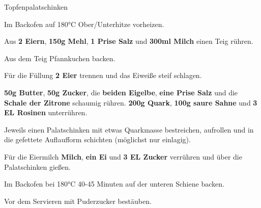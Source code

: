 \begin{recipe}[]{Topfenpalatschinken} %

\step
Im Backofen auf 180°C Ober/Unterhitze vorheizen.

\step
Aus \textbf{2 Eiern}, \textbf{150g Mehl}, \textbf{1 Prise Salz} und \textbf{300ml Milch} einen Teig rühren.

\step
Aus dem Teig Pfannkuchen backen.

\step
Für die Füllung \textbf{2 Eier} trennen und das Eiweiße steif schlagen.

\step
\textbf{50g Butter}, \textbf{50g Zucker}, die \textbf{beiden Eigelbe}, \textbf{eine Prise Salz} und die \textbf{Schale der Zitrone} schaumig rühren. \textbf{200g Quark}, \textbf{100g saure Sahne} und \textbf{3 EL Rosinen} unterrühren.

\step
Jeweils einen Palatschinken mit etwas Quarkmasse bestreichen, aufrollen und in die gefettete Auflaufform schichten (möglichst nur einlagig).

\step
Für die Eiermilch \textbf{ Milch}, \textbf{ein Ei} und \textbf{3 EL Zucker} verrühren und über die Palatschinken gießen.

\step
Im Backofen bei 180°C 40-45 Minuten auf der unteren Schiene backen.

\step
Vor dem Servieren mit Puderzucker bestäuben. 

\end{recipe}